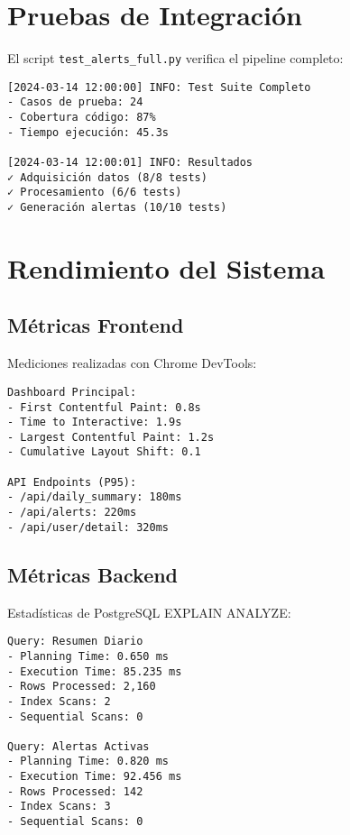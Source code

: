 \section{Pruebas de Integración}
\label{anexo:pruebas:integracion}

El script \texttt{test\_alerts\_full.py} verifica el pipeline completo:

\begin{verbatim}
[2024-03-14 12:00:00] INFO: Test Suite Completo
- Casos de prueba: 24
- Cobertura código: 87%
- Tiempo ejecución: 45.3s

[2024-03-14 12:00:01] INFO: Resultados
✓ Adquisición datos (8/8 tests)
✓ Procesamiento (6/6 tests)
✓ Generación alertas (10/10 tests)
\end{verbatim}

\section{Rendimiento del Sistema}
\label{anexo:pruebas:rendimiento}

\subsection{Métricas Frontend}

Mediciones realizadas con Chrome DevTools:

\begin{verbatim}
Dashboard Principal:
- First Contentful Paint: 0.8s
- Time to Interactive: 1.9s
- Largest Contentful Paint: 1.2s
- Cumulative Layout Shift: 0.1

API Endpoints (P95):
- /api/daily_summary: 180ms
- /api/alerts: 220ms
- /api/user/detail: 320ms
\end{verbatim}

\subsection{Métricas Backend}

Estadísticas de PostgreSQL EXPLAIN ANALYZE:

\begin{verbatim}
Query: Resumen Diario
- Planning Time: 0.650 ms
- Execution Time: 85.235 ms
- Rows Processed: 2,160
- Index Scans: 2
- Sequential Scans: 0

Query: Alertas Activas
- Planning Time: 0.820 ms
- Execution Time: 92.456 ms
- Rows Processed: 142
- Index Scans: 3
- Sequential Scans: 0
\end{verbatim}

